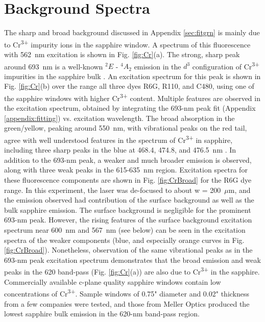 \chapter{Background Spectra}
\label{appendix:bgs}

The sharp and broad background discussed in Appendix \ref{sec:fitgrn} is mainly due to Cr\textsuperscript{3+} impurity ions in the sapphire window.  A spectrum of this fluorescence with 562~nm excitation is shown in Fig. \ref{fig:Cr}(a).  The strong, sharp peak around 693~nm is a well-known $^{2}E$ - $^{4}A_{2}$ emission in the $d^{3}$ configuration of Cr\textsuperscript{3+} impurities in the sapphire bulk \cite{SapphireRlines1964,SapphireRlines2010}.  An excitation spectrum for this peak is shown in Fig. \ref{fig:Cr}(b) over the range all three dyes R6G, R110, and C480, using one of the sapphire windows with higher Cr\textsuperscript{3+} content.  Multiple features are observed in the excitation spectrum, obtained by integrating the 693-nm peak fit (Appendix \ref{appendix:fitting}) vs. excitation wavelength.  The broad absorption in the green/yellow, peaking around 550~nm, with vibrational peaks on the red tail, agree with well understood features in the spectrum of Cr\textsuperscript{3+} in sapphire, including three sharp peaks in the blue at 468.4, 474.8, and 476.5~nm \cite{SapphireFord,SapphireMcclure}.  In addition to the 693-nm peak, a weaker and much broader emission is observed, along with three weak peaks in the 615-635~nm region.  Excitation spectra for these fluorescence components are shown in Fig. \ref{fig:CrBroad} for the R6G dye range.  In this experiment, the laser was de-focused to about w = 200~$\mu$m, and the emission observed had contribution of the surface background as well as the bulk sapphire emission.  The surface background is negligible for the prominent 693-nm peak.  However, the rising features of the surface background excitation spectrum near 600~nm and 567~nm (see below) can be seen in the excitation spectra of the weaker components (blue, and especially orange curves in Fig. \ref{fig:CrBroad}).  Nonetheless, observation of the same vibrational peaks as in the 693-nm peak excitation spectrum demonstrates that the broad emission and weak peaks in the 620 band-pass (Fig. \ref{fig:Cr}(a)) are also due to Cr\textsuperscript{3+} in the sapphire.  Commercially available c-plane quality sapphire windows contain low concentrations of Cr\textsuperscript{3+}.  Sample windows of 0.75" diameter and 0.02" thickness from a few companies were tested, and those from Meller Optics produced the lowest sapphire bulk emission in the 620-nm band-pass region.

